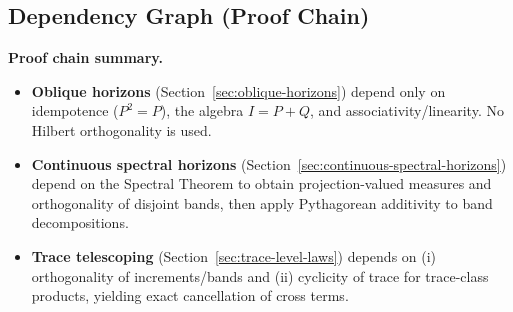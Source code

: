 \subsection{Dependency Graph (Proof Chain)}
\label{subsec:layer2-dependency-graph}

\noindent\textbf{Proof chain summary.}
\begin{itemize}[itemsep=0.3em]
\item \textbf{Oblique horizons} (Section~\ref{sec:oblique-horizons}) depend only on idempotence ($P^2=P$), the algebra $I=P+Q$, and associativity/linearity. No Hilbert orthogonality is used.
\item \textbf{Continuous spectral horizons} (Section~\ref{sec:continuous-spectral-horizons}) depend on the Spectral Theorem to obtain projection-valued measures and orthogonality of disjoint bands, then apply Pythagorean additivity to band decompositions.
\item \textbf{Trace telescoping} (Section~\ref{sec:trace-level-laws}) depends on (i) orthogonality of increments/bands and (ii) cyclicity of trace for trace-class products, yielding exact cancellation of cross terms.
\end{itemize}

